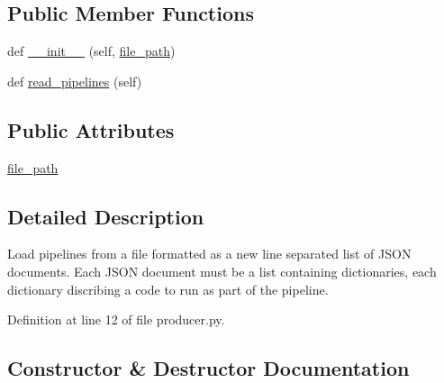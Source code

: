 \subsection*{Public Member Functions}
\begin{DoxyCompactItemize}
\item 
def \hyperlink{classcodar_1_1savanna_1_1producer_1_1_j_s_o_n_file_pipeline_reader_a55313d819000a60b4c1d0acc6723722b}{\+\_\+\+\_\+init\+\_\+\+\_\+} (self, \hyperlink{classcodar_1_1savanna_1_1producer_1_1_j_s_o_n_file_pipeline_reader_a492f862e3d8692400cc29b11df5cf137}{file\+\_\+path})
\item 
def \hyperlink{classcodar_1_1savanna_1_1producer_1_1_j_s_o_n_file_pipeline_reader_a1b4cf622fdd2146181d5776f044c97c6}{read\+\_\+pipelines} (self)
\end{DoxyCompactItemize}
\subsection*{Public Attributes}
\begin{DoxyCompactItemize}
\item 
\hyperlink{classcodar_1_1savanna_1_1producer_1_1_j_s_o_n_file_pipeline_reader_a492f862e3d8692400cc29b11df5cf137}{file\+\_\+path}
\end{DoxyCompactItemize}


\subsection{Detailed Description}
\begin{DoxyVerb}Load pipelines from a file formatted as a new line separated list of
JSON documents. Each JSON document must be a list containing dictionaries,
each dictionary discribing a code to run as part of the pipeline.\end{DoxyVerb}
 

Definition at line 12 of file producer.\+py.



\subsection{Constructor \& Destructor Documentation}
\mbox{\label{classcodar_1_1savanna_1_1producer_1_1_j_s_o_n_file_pipeline_reader_a55313d819000a60b4c1d0acc6723722b}} 
